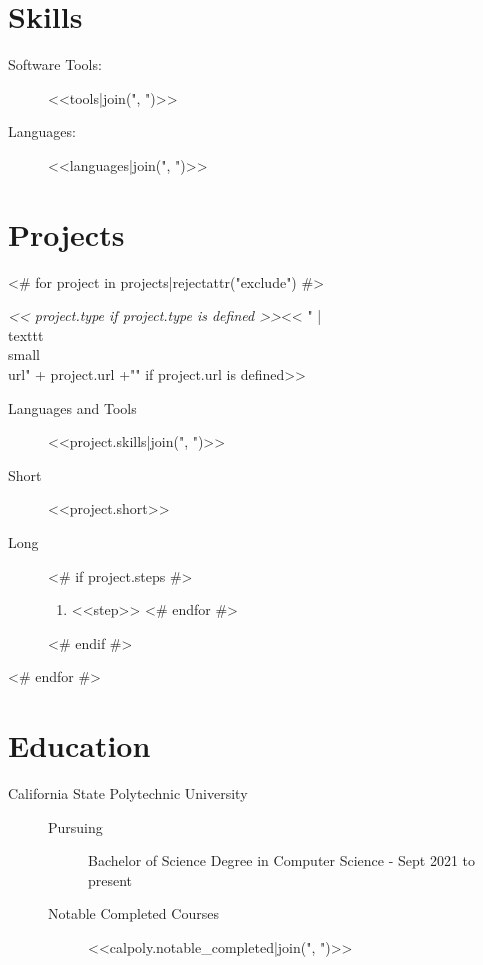 \documentclass[a4paper, 10pt]{article}
\begin{document}
    \section*{Skills}
    \begin{multicols}{2}
        \begin{description}
            \item [ Software Tools: ] <<tools|join(", ")>>
                \columnbreak
            \item [ Languages: ] <<languages|join(", ")>>
        \end{description}
    \end{multicols}

    \section*{Projects}
    \begin{description}
            <# for project in projects|rejectattr("exclude") #>
        \item[<<project.name>>] \textit{<< project.type if project.type is defined >>}<< " | \\texttt{\\small \\url{" + project.url +"}}" if project.url is defined>>
            \begin{description}
                \item [ Languages and Tools ] <<project.skills|join(", ")>>
                \item [ Short ] <<project.short>>
                \item [ Long ]\mbox{}
                    <# if project.steps #>
                    \begin{enumerate}[label=(\Roman*)]
                            <# for step in project.steps #>
                        \item <<step>>
                            <# endfor #>
                    \end{enumerate}
                    <# endif #>
            \end{description}
            <# endfor #>
    \end{description}

    \section*{Education}
    \begin{description}
        \item [ California State Polytechnic University ]\mbox{}
    \begin{description}
        \item [Pursuing] Bachelor of Science Degree in Computer Science - Sept 2021 to present
        \item [Notable Completed Courses] <<calpoly.notable_completed|join(", ")>>
    \end{description}
    \end{description}

    
\end{document}
